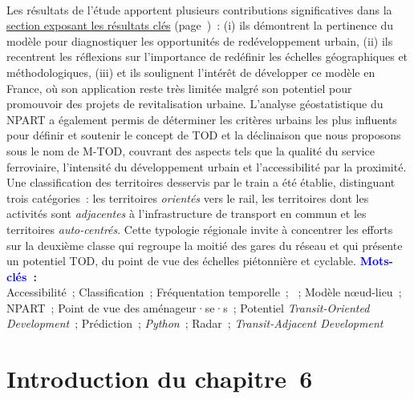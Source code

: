 \begin{refsegment}
\begin{tcolorbox}
{    \\
Les résultats de l’étude apportent plusieurs contributions significatives dans la \hyperref[chap6:resultats-modele]{section exposant les résultats clés} (page~\pageref{chap6:resultats-modele})~: (i) ils démontrent la pertinence du modèle pour diagnostiquer les opportunités de redéveloppement urbain, (ii) ils recentrent les réflexions sur l'importance de redéfinir les échelles géographiques et méthodologiques, (iii) et ils soulignent l'intérêt de développer ce modèle en France, où son application reste très limitée malgré son potentiel pour promouvoir des projets de revitalisation urbaine. L'analyse géostatistique du \acrshort{NPART} a également permis de déterminer les critères urbains les plus influents pour définir et soutenir le concept de \acrshort{TOD} et la déclinaison que nous proposons sous le nom de \acrshort{M-TOD}, couvrant des aspects tels que la qualité du service ferroviaire, l'intensité du développement urbain et l'\gls{accessibilité} par la proximité. Une classification des territoires desservis par le train a été établie, distinguant trois catégories~: les territoires \textsl{orientés} vers le rail, les territoires dont les activités sont \textsl{adjacentes} à l'infrastructure de transport en commun et les territoires \textsl{auto-centrés}. Cette typologie régionale invite à concentrer les efforts sur la deuxième classe qui regroupe la moitié des gares du réseau et qui présente un potentiel \acrshort{TOD}, du point de vue des échelles piétonnière et cyclable.%
    }
    \tcblower
\Large{\textcolor{blue}{\textbf{Mots-clés~:}}}
    \\
    \small{
Accessibilité~;
Classification~;
Fréquentation temporelle~;
~;
Modèle nœud-lieu~;
NPART~;
Point de vue des aménageur·se·s~;
Potentiel \textsl{Transit-Oriented Development}~;
Prédiction~;
\textsl{Python}~;
Radar~;
\textsl{Transit-Adjacent Development}
    }
    \end{tcolorbox}

    \newpage
\section*{Introduction du chapitre~6
    \label{chap6:introduction}
    }


\end{refsegment}
